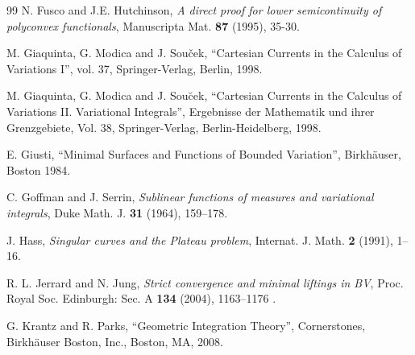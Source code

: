\documentclass[a4paper,11pt]{article}
\numberwithin{equation}{section}
\newcommand\Suno{{\mathbb S}^1}
\begin{document}
\begin{thebibliography}{99}
N. Fusco and J.E. Hutchinson, 
\emph{A direct proof for lower semicontinuity of polyconvex functionals},
Manuscripta Mat. {\bf 87} (1995), 35-30.

M. Giaquinta, G. Modica and J. Sou\v{c}ek, ``Cartesian Currents in the
Calculus of Variations I'', vol. 37, Springer-Verlag, Berlin, 1998.

 { M. Giaquinta, G. Modica and J. Sou\u{c}ek}, 
``Cartesian Currents in the Calculus of Variations II. Variational Integrals'',
Ergebnisse der Mathematik und ihrer Grenzgebiete, Vol. 38,
Springer-Verlag, Berlin-Heidelberg, 1998.

 { E. Giusti},
``Minimal Surfaces and Functions of Bounded Variation'',
Birkh\"auser, Boston
1984.
%






%
%
%
%
%

 C. Goffman and J. Serrin, \emph{Sublinear functions of measures and variational integrals}, Duke Math. J. {\bf 31} (1964), 159--178.

 J. Hass,
\emph{Singular curves and the Plateau problem}, 
Internat. J. Math. {\bf 2} (1991), 1–16. 


R. L. Jerrard and N. Jung, \textit{Strict convergence and minimal liftings in BV}, Proc. Royal Soc. Edinburgh: Sec. A {\bf 134} (2004), 1163--1176 .

 G. Krantz and R. Parks,
``Geometric Integration Theory'',
Cornerstones, Birkh\"auser Boston, Inc., Boston, MA, 2008.


\end{thebibliography}
\end{document}
